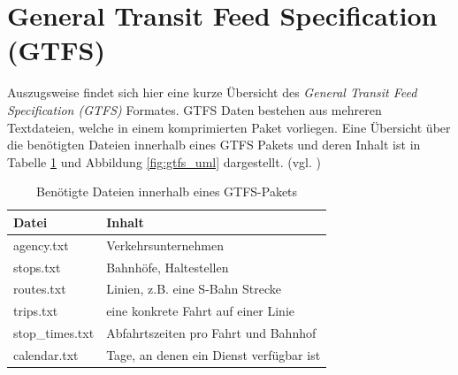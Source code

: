 \section{General Transit Feed Specification (GTFS)}
\label{sec:appendix:gtfs_spec}
Auszugsweise findet sich hier eine kurze Übersicht des \textit{General Transit Feed Specification (GTFS)} Formates.
GTFS Daten bestehen aus mehreren Textdateien, welche in einem komprimierten Paket vorliegen.
Eine Übersicht über die benötigten Dateien innerhalb eines GTFS Pakets und deren Inhalt ist in Tabelle \ref{tab:gtfs_files} und Abbildung \ref{fig:gtfs_uml} dargestellt. (vgl. \cite{WEB:Google:gtfs:2016})


\begin{table}[h]
\centering
\caption{Benötigte Dateien innerhalb eines GTFS-Pakets}
\label{tab:gtfs_files}
\begin{tabular}{|l|l|}
\hline
\textbf{Datei}  & \textbf{Inhalt}                         \\ \hline
agency.txt      & Verkehrsunternehmen                     \\ \hline
stops.txt       & Bahnhöfe, Haltestellen                  \\ \hline
routes.txt      & Linien, z.B. eine S-Bahn Strecke        \\ \hline
trips.txt       & eine konkrete Fahrt auf einer Linie     \\ \hline
stop\_times.txt & Abfahrtszeiten pro Fahrt und Bahnhof    \\ \hline
calendar.txt    & Tage, an denen ein Dienst verfügbar ist \\ \hline
\end{tabular}
\end{table}


